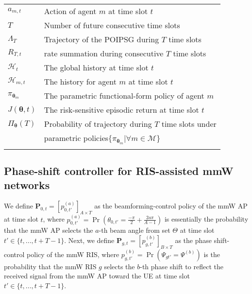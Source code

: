 \documentclass[conference]{IEEEtran}
\begin{document}
\begin{table}[t]
\begin{center}
\begin{tabular}{l | l }
$a_{m,t}$   & Action of agent $m$ at time slot $t$\\ \rowcolor[gray]{.9}
$T$ & Number of future consecutive time slots \\
$\Lambda_{T}$  & Trajectory of the POIPSG during $T$ time slots\\ \rowcolor[gray]{.9}
$R_{T,t}$ & rate summation during consecutive $T$ time slots \\
$\mathcal{H}_t$ & The global history at time slot $t$ \\ \rowcolor[gray]{.9}
$\mathcal{H}_{m,t}$   & The history for agent $m$ at time slot $t$\\
$\pi_{\boldsymbol{\theta}_m}$ & The parametric functional-form policy of agent $m$ \\ \rowcolor[gray]{.9}
$J(\boldsymbol{\theta},t)$  & The risk-sensitive episodic return at time slot $t$\\
$\Pi_{\boldsymbol{\theta}}(T)$   & Probability of trajectory during $T$ time slots under\\
& parametric policies$\{\pi_{\boldsymbol{\theta}_m}|\forall m \in \mathcal{M}\}$\\
\rowcolor[gray]{.9}
\hline
\end{tabular}
\end{center}
\label{tab:Symbols}
\vspace{-9mm}
\end{table}

\vspace{-0.4cm}
\subsection{Phase-shift controller for RIS-assisted mmW networks}\label{Sec:Optimum}
We define $\boldsymbol{P}_{0,t}=[p_{0,t'}^{(a)}]_{A \times T}$ as the beamforming-control policy of the mmW AP at time slot $t$, where $p_{0,t'}^{(a)}=\Pr(\theta_{0,t'}=\frac{-\pi}{2}+\frac{2a\pi}{A-1})$ is essentially the probability that the mmW AP selects the $a$-th beam angle from set $\Theta$ at time slot $t' \in \{t,...,t+T-1\}$. Next, we define $\boldsymbol{P}_{g,t}=[p_{g,t'}^{(b)}]_{B \times T}$ as the phase shift-control policy of the mmW RIS, where $p_{g,t'}^{(b)}=\Pr(\Psi_{gt'}=\Psi^{(b)})$ is the probability that the mmW RIS $g$ selects the $b$-th phase shift to reflect the received signal from the mmW AP toward the UE at time slot $t' \in \{t,...,t+T-1\}$.
\end{document}
